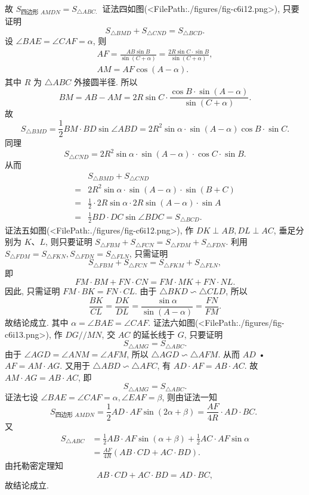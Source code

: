 故
$S_{\text {四边形 } A M D N}=S_{\triangle A B C \text {. }}$
证法四如图(<FilePath:./figures/fig-c6i12.png>), 只要证明
$$
S_{\triangle B M D}+S_{\triangle C N D}=S_{\triangle B C D} .
$$
设 $\angle B A E=\angle C A F=\alpha$, 则
$$
\begin{gathered}
A F=\frac{A B \sin B}{\sin (C+\alpha)}=\frac{2 R \sin C \cdot \sin B}{\sin (C+\alpha)}, \\
A M=A F \cos (A-\alpha) .
\end{gathered}
$$
其中 $R$ 为 $\triangle A B C$ 外接圆半径.
所以
$$
B M=A B-A M=2 R \sin C \cdot \frac{\cos B \cdot \sin (A-\alpha)}{\sin (C+\alpha)} .
$$
故
$$
S_{\triangle B M D}=\frac{1}{2} B M \cdot B D \sin \angle A B D=2 R^2 \sin \alpha \cdot \sin (A-\alpha) \cos B \cdot \sin C .
$$
同理
$$
S_{\triangle C N D}=2 R^2 \sin \alpha \cdot \sin (A-\alpha) \cdot \cos C \cdot \sin B .
$$
从而
$$
\begin{aligned}
& S_{\triangle B M D}+S_{\triangle C N D} \\
= & 2 R^2 \sin \alpha \cdot \sin (A-\alpha) \cdot \sin (B+C) \\
= & \frac{1}{2} \cdot 2 R \sin \alpha \cdot 2 R \sin (A-\alpha) \cdot \sin A \\
= & \frac{1}{2} B D \cdot D C \sin \angle B D C=S_{\triangle B C D} .
\end{aligned}
$$
证法五如图(<FilePath:./figures/fig-c6i12.png>), 作 $D K \perp A B, D L \perp A C$, 垂足分别为 $K 、 L$, 则只要证明 $S_{\triangle F B M}+S_{\triangle F C N}=S_{\triangle F D M}+S_{\triangle F D N}$.
利用 $S_{\triangle F D M}=S_{\triangle F K N}, S_{\triangle F D N}=S_{\triangle F L N}$, 只需证明
$$
S_{\triangle F B M}+S_{\triangle F C N}=S_{\triangle F K M}+S_{\triangle F L N},
$$
即
$$
F M \cdot B M+F N \cdot C N=F M \cdot M K+F N \cdot N L .
$$
因此, 只需证明 $F M \cdot B K=F N \cdot C L$.
由于 $\triangle B K D \backsim \triangle C L D$, 所以
$$
\frac{B K}{C L}=\frac{D K}{D L}=\frac{\sin \alpha}{\sin (A-\alpha)}=\frac{F N}{F M} .
$$
故结论成立.
其中 $\alpha=\angle B A E=\angle C A F$.
证法六如图(<FilePath:./figures/fig-c6i13.png>), 作 $D G / / M N$, 交 $A C$ 的延长线于 $G$, 只要证明
$$
S_{\triangle A M G}=S_{\triangle A B C} .
$$
由于 $\angle A G D=\angle A N M=\angle A F M$, 所以 $\triangle A G D \backsim \triangle A F M$. 从而 $A D$ • $A F=A M \cdot A G$. 又用于 $\triangle A B D \backsim \triangle A F C$, 有 $A D \cdot A F=A B \cdot A C$.
故 $A M \cdot A G=A B \cdot A C$, 即
$$
S_{\triangle A M G}=S_{\triangle A B C} .
$$
证法七设 $\angle B A E=\angle C A F=\alpha, \angle E A F=\beta$, 则由证法一知
$$
S_{\text {四边形 } A M D N}=\frac{1}{2} A D \cdot A F \sin (2 \alpha+\beta)=\frac{A F}{4 R} \cdot A D \cdot B C \text {. }
$$
又
$$
\begin{aligned}
S_{\triangle A B C} & =\frac{1}{2} A B \cdot A F \sin (\alpha+\beta)+\frac{1}{2} A C \cdot A F \sin \alpha \\
& =\frac{A F}{4 R}(A B \cdot C D+A C \cdot B D) .
\end{aligned}
$$
由托勒密定理知
$$
A B \cdot C D+A C \cdot B D=A D \cdot B C,
$$
故结论成立.


